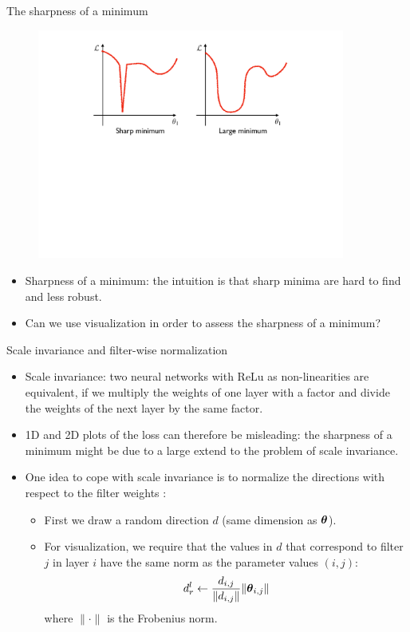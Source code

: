 \documentclass[xcolor=pdftex,dvipsnames,table]{beamer}
\begin{document}
\begin{frame}{The sharpness of a minimum}
\begin{figure}[htb]
\includegraphics[width=0.9\textwidth]{../graphics/Vis_sharpness.pdf}
\end{figure}
\begin{itemize}
	\item Sharpness of a minimum: the intuition is that sharp minima are hard to find and less robust. 
	\item Can we use visualization in order to assess the sharpness of a minimum? 
\end{itemize}
\end{frame}

\begin{frame}{Scale invariance and filter-wise normalization}
\begin{itemize}
	\item Scale invariance: two neural networks with ReLu as non-linearities are equivalent, if we multiply the weights of one layer with a factor and divide the weights of the next layer by the same factor. 
	\item 1D and 2D plots of the loss can therefore be misleading: the sharpness of a minimum might be due to a large extend to the problem of scale invariance. 
	\item One idea to cope with scale invariance is to normalize the directions with respect to the filter weights \cite{Li:2018}:
	\begin{itemize}
		\item First we draw a random direction $d$ (same dimension as $\boldsymbol{\theta}$). 
		\item For visualization, we require that the values in $d$ that correspond to filter $j$ in layer $i$ have the same norm as the parameter values $(i,j)$:
		\begin{equation}
			d^l_r \leftarrow \frac{d_{i,j}}{\|d_{i,j}\|}\|\boldsymbol{\theta}_{i,j}\|
		\end{equation}
		where $\|\cdot\|$ is the Frobenius norm. 
	\end{itemize}
\end{itemize}
\end{frame}
\end{document}
